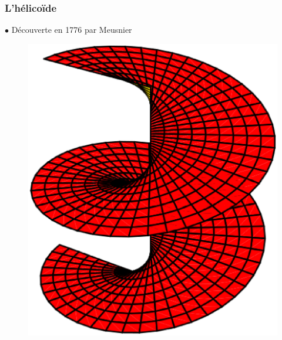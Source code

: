 \documentclass{beamer}
\begin{document}
\begin{frame}
\frametitle{L'hélicoïde}
$\bullet$ Découverte en 1776 par Meusnier
\begin{figure}[h!]
      \centering 
      \includegraphics[scale=0.30]{4.eps}
\end{figure}
\end{frame}
\end{document}
